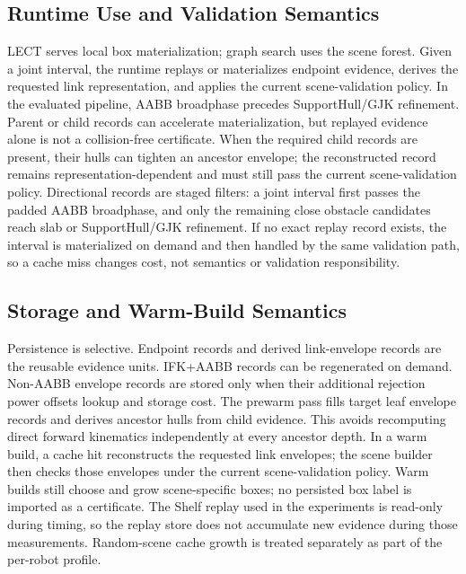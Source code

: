 \documentclass[journal]{IEEEtran}
\begin{document}
\subsection{Runtime Use and Validation Semantics}

LECT serves local box materialization; graph search uses the scene forest. Given
a joint interval, the runtime replays or materializes endpoint evidence, derives
the requested link representation, and applies the current scene-validation
policy. In the evaluated pipeline, AABB broadphase precedes SupportHull/GJK
refinement. Parent or child records can accelerate materialization, but replayed
evidence alone is not a collision-free certificate. When the required child
records are present, their hulls can tighten an ancestor envelope; the
reconstructed record remains representation-dependent and must still pass the
current scene-validation policy.
Directional records are staged filters: a joint interval first passes the
padded AABB broadphase, and only the remaining close obstacle candidates reach
slab or SupportHull/GJK refinement. If no exact replay record exists, the
interval is materialized on demand and then handled by the same validation path,
so a cache miss changes cost, not semantics or validation responsibility.

\subsection{Storage and Warm-Build Semantics}\label{sec:lect_storage}

Persistence is selective. Endpoint records and derived link-envelope records are
the reusable evidence units. IFK+AABB records can be regenerated on demand.
Non-AABB envelope records are stored only when their additional rejection power
offsets lookup and storage cost. The prewarm pass fills target leaf envelope
records and derives ancestor hulls from child evidence. This
avoids recomputing direct forward kinematics independently at every ancestor
depth. In a warm build, a cache hit reconstructs the requested link envelopes;
the scene builder then checks those envelopes under the current
scene-validation policy. Warm builds still choose and grow scene-specific boxes;
no persisted box label is imported as a certificate. The Shelf replay used in
the experiments is read-only during timing, so the replay store does not
accumulate new evidence during those measurements. Random-scene cache growth is
treated separately as part of the per-robot profile.

\end{document}
